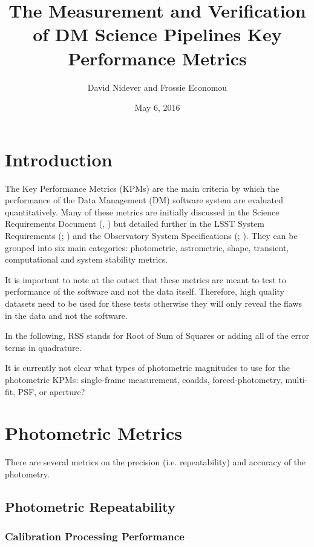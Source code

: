\documentclass[DM,lsstdraft,toc]{lsstdoc}
\title[Measurement and Verification of KPMs]{The Measurement and Verification of DM Science Pipelines Key Performance Metrics}
\author{David Nidever and Frossie Economou}
\date{May 6, 2016}
\begin{document}
\maketitle

\section{Introduction}\label{introduction}

The Key Performance Metrics (KPMs) are the main criteria by which the
performance of the Data Management (DM) software system are evaluated
quantitatively. Many of these metrics are initially discussed in the
Science Requirements Document (\SRD, ) but detailed further in the
LSST System Requirements (\LSR; ) and the Observatory System
Specifications (\OSS; ). They can be grouped into six main
categories: photometric, astrometric, shape, transient, computational
and system stability metrics.

It is important to note at the outset that these metrics are meant to
test to performance of the software and not the data itself. Therefore,
high quality datasets need to be used for these tests otherwise they
will only reveal the flaws in the data and not the software.

In the following, RSS stands for Root of Sum of Squares or adding all of
the error terms in quadrature.

\begin{note}
It is currently not clear what types of photometric magnitudes to use
for the photometric KPMs: single-frame measurement, coadds,
forced-photometry, multi-fit, PSF, or aperture?
\end{note}

\section{Photometric Metrics}\label{photometric-metrics}

There are several metrics on the precision (i.e. repeatability) and
accuracy of the photometry.

\subsection{Photometric Repeatability}\label{photometric-repeatability}

\subsubsection{Calibration Processing
Performance}\label{calibration-processing-performance}
\end{document}
